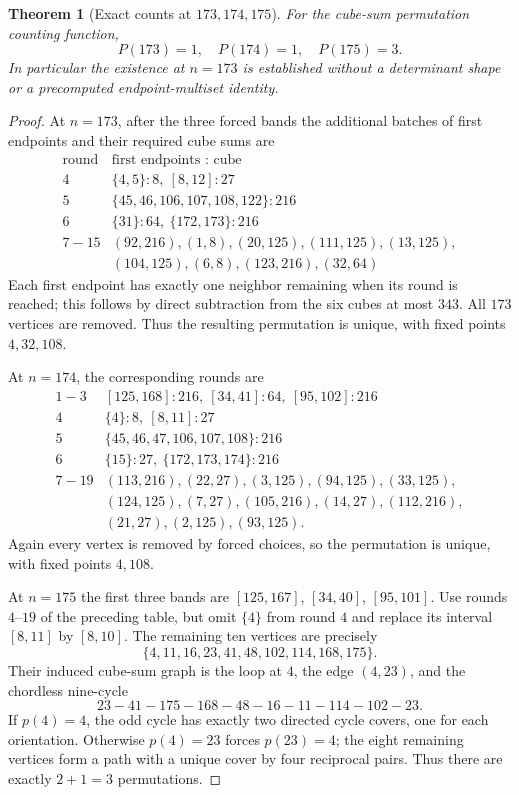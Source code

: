 \documentclass[10pt]{article}
\newtheorem{theorem}{Theorem}
\begin{document}
\begin{theorem}[Exact counts at $173,174,175$]
\label{thm:forced-base}
For the cube-sum permutation counting function,
\[
\boxed{P(173)=1,\quad P(174)=1,\quad P(175)=3.}
\]
In particular the existence at $n=173$
is established without a determinant shape
or a precomputed endpoint-multiset identity.
\end{theorem}
\begin{proof}
At $n=173$, after the three forced bands
the additional batches of first endpoints
and their required cube sums are
\[
\begin{array}{c|l}
\text{round}& \text{first endpoints : cube}\\ \hline
4&\{4,5\}:8,\ [8,12]:27\\
5&\{45,46,106,107,108,122\}:216\\
6&\{31\}:64,\ \{172,173\}:216\\
7\!-\!15&(92,216),(1,8),(20,125),(111,125),
(13,125),\\
& (104,125),(6,8),(123,216),(32,64)
\end{array}
\]
Each first endpoint has exactly one neighbor
remaining when its round is reached;
this follows by direct subtraction from the
six cubes at most $343$. All $173$ vertices
are removed. Thus the resulting permutation
is unique, with fixed points $4,32,108$.

At $n=174$, the corresponding rounds are
\[
\begin{array}{c|l}
1\!-\!3&[125,168]:216,\ [34,41]:64,\ [95,102]:216\\
4&\{4\}:8,\ [8,11]:27\\
5&\{45,46,47,106,107,108\}:216\\
6&\{15\}:27,\ \{172,173,174\}:216\\
7\!-\!19&(113,216),(22,27),(3,125),(94,125),
(33,125),\\
&(124,125),(7,27),(105,216),(14,27),
(112,216),\\
&(21,27),(2,125),(93,125).
\end{array}
\]
Again every vertex is removed by forced choices,
so the permutation is unique, with fixed
points $4,108$.

At $n=175$ the first three bands are
$[125,167]$, $[34,40]$, $[95,101]$.
Use rounds $4$--$19$ of the preceding table,
but omit $\{4\}$ from round $4$ and
replace its interval $[8,11]$ by $[8,10]$.
The remaining ten vertices are precisely
\[
\{4,11,16,23,41,48,102,114,168,175\}.
\]
Their induced cube-sum graph is the loop at
$4$, the edge $(4,23)$, and the chordless
nine-cycle
\[
23-41-175-168-48-16-11-114-102-23.
\]
If $p(4)=4$, the odd cycle has exactly
two directed cycle covers, one for each
orientation. Otherwise $p(4)=23$
forces $p(23)=4$; the eight remaining
vertices form a path with a unique
cover by four reciprocal pairs. Thus
there are exactly $2+1=3$ permutations.
\end{proof}
\end{document}

